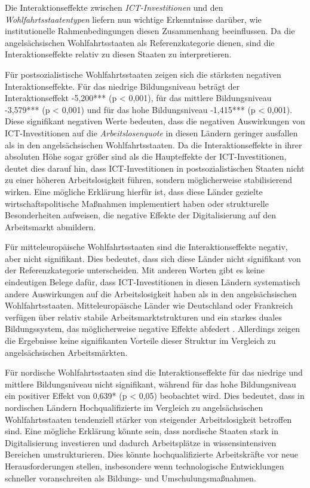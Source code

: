 Die Interaktionseffekte zwischen \textit{\ac{ICT}-Investitionen} und den 
\textit{Wohlfahrtsstaatentypen} liefern nun wichtige Erkenntnisse darüber, wie institutionelle 
Rahmenbedingungen diesen Zusammenhang beeinflussen. Da die angelsächsischen Wohlfahrtsstaaten 
als Referenzkategorie dienen, sind die Interaktionseffekte relativ zu diesen Staaten zu 
interpretieren.

Für postsozialistische Wohlfahrtsstaaten zeigen sich die stärksten negativen Interaktionseffekte. 
Für das niedrige Bildungsniveau beträgt der Interaktionseffekt -5,200*** (p < 0,001), für das 
mittlere Bildungsniveau -3,579*** (p < 0,001) und für das hohe Bildungsniveau -1,415*** 
(p < 0,001). Diese signifikant negativen Werte bedeuten, dass die negativen Auswirkungen von 
\ac{ICT}-Investitionen auf die \textit{Arbeitslosenquote} in diesen Ländern geringer ausfallen 
als in den angelsächsischen Wohlfahrtsstaaten. Da die Interaktionseffekte in ihrer absoluten Höhe 
sogar größer sind als die Haupteffekte der \ac{ICT}-Investitionen, deutet dies darauf hin, dass 
\ac{ICT}-Investitionen in postsozialistischen Staaten nicht zu einer höheren Arbeitslosigkeit 
führen, sondern möglicherweise stabilisierend wirken. Eine mögliche Erklärung hierfür ist, dass 
diese Länder gezielte wirtschaftspolitische Maßnahmen implementiert haben oder strukturelle 
Besonderheiten aufweisen, die negative Effekte der Digitalisierung auf den Arbeitsmarkt abmildern.

Für mitteleuropäische Wohlfahrtsstaaten sind die Interaktionseffekte negativ, aber nicht 
signifikant. Dies bedeutet, dass sich diese Länder nicht signifikant von der Referenzkategorie 
unterscheiden. Mit anderen Worten gibt es keine eindeutigen Belege dafür, dass 
\ac{ICT}-Investitionen in diesen Ländern systematisch andere Auswirkungen auf die 
Arbeitslosigkeit haben als in den angelsächsischen Wohlfahrtsstaaten. Mitteleuropäische Länder 
wie Deutschland oder Frankreich verfügen über relativ stabile Arbeitsmarktstrukturen und ein 
starkes duales Bildungssystem, das möglicherweise negative Effekte abfedert 
\parencite[vgl.][S. 25]{hall2001varieties}. Allerdings zeigen die Ergebnisse keine signifikanten 
Vorteile dieser Struktur im Vergleich zu angelsächsischen Arbeitsmärkten.

Für nordische Wohlfahrtsstaaten sind die Interaktionseffekte für das niedrige und mittlere 
Bildungsniveau nicht signifikant, während für das hohe Bildungsniveau ein positiver Effekt von 
0,639* (p < 0,05) beobachtet wird. Dies bedeutet, dass in nordischen Ländern Hochqualifizierte 
im Vergleich zu angelsächsischen Wohlfahrtsstaaten tendenziell stärker von steigender 
Arbeitslosigkeit betroffen sind. Eine mögliche Erklärung könnte sein, dass nordische Staaten stark 
in Digitalisierung investieren und dadurch Arbeitsplätze in wissensintensiven Bereichen 
umstrukturieren. Dies könnte hochqualifizierte Arbeitskräfte vor neue Herausforderungen stellen, 
insbesondere wenn technologische Entwicklungen schneller voranschreiten als Bildungs- und 
Umschulungsmaßnahmen.

